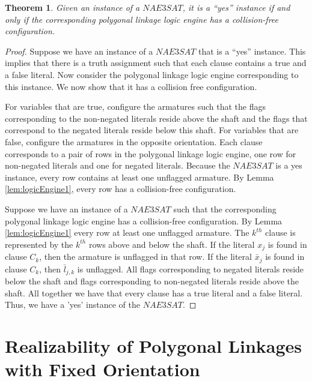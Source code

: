 \documentclass[10pt]{CSUNthesis}
\theoremstyle{plain}%
\newtheorem{thm}{Theorem}
\theoremstyle{definition}
\theoremstyle{remark}
\begin{document}
\begin{thm}\label{thm:chp2-HingedPolygons-1}
 Given an instance of a $NAE3SAT$,  it is a ``yes'' instance if and only if the 
corresponding polygonal linkage logic engine has a collision-free configuration.  
\end{thm}
\begin{proof}
Suppose we have an instance of a $NAE3SAT$ that is a ``yes'' instance. This implies that there is a 
truth assignment such that each clause contains a true and a false literal. Now consider the polygonal linkage logic 
engine corresponding to this instance. We now 
show that it has a collision free configuration.

For variables that are true, configure the armatures such that the flags corresponding to the 
non-negated literals reside above the 
shaft and the flags that correspond to the negated literals reside below this shaft.  For variables 
that are false, configure the 
armatures in the opposite orientation.  Each clause corresponds to a pair of rows in 
the polygonal linkage logic engine, one row for non-negated literals and one for negated literals.  Because the 
$NAE3SAT$ is a yes instance, every row contains at least one unflagged armature.  
By Lemma \ref{lem:logicEngine1}, every row  has a collision-free configuration.

Suppose we have an instance of a $NAE3SAT$ such that the corresponding polygonal linkage logic engine has a 
collision-free configuration. By Lemma \ref{lem:logicEngine1} every row at least one unflagged 
armature.  The $k^{th}$ clause is represented by the $k^{th}$ rows above and below the shaft. If the 
literal $x_j$ is found in clause $C_k$, then the armature is unflagged in that row. If the literal 
$\bar{x}_j$ is found in clause $C_k$, then $\bar{l}_{j,k}$ is unflagged.  All flags 
corresponding to negated literals reside below the shaft and flags corresponding to non-negated 
literals reside above the shaft.  All together we have that every clause has a true literal and a 
false literal.  Thus, we have a 'yes' instance of the $NAE3SAT$.
\end{proof}\chapter{Realizability of Polygonal Linkages with Fixed Orientation\label{chapter:polygonalLinkage}}
\end{document}
